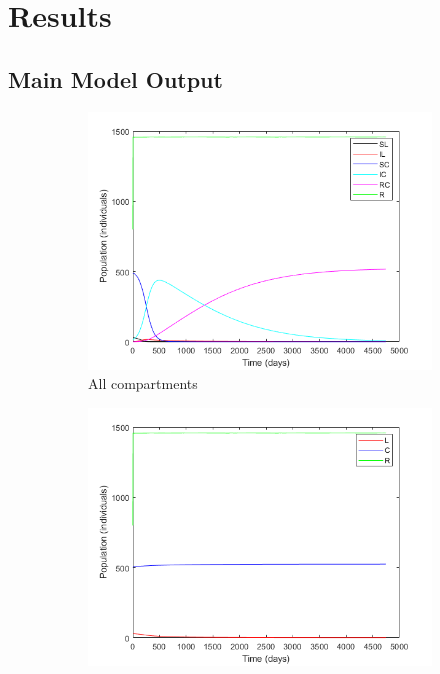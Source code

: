 \documentclass[12pt]{article}
\begin{document}
\section{Results}

\subsection{Main Model Output}
\begin{figure}[!ht]
    \centering
    \begin{subfigure}{0.45\textwidth}
        \centering
        \includegraphics[width=\textwidth]{images/main_all.png}
        \caption{All compartments}
    \end{subfigure}
    \begin{subfigure}{0.45\textwidth}
        \centering
        \includegraphics[width=\textwidth]{images/main_total.png}

\end{subfigure}
\end{figure}
\end{document}
